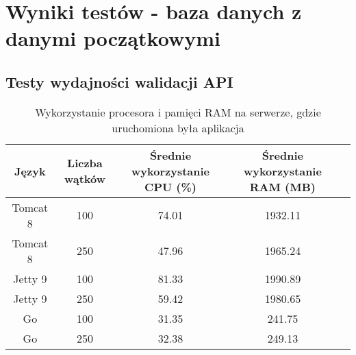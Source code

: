  \newpage
 \section{Wyniki testów - baza danych z danymi początkowymi}
 \subsection{Testy wydajności walidacji API}
% 
 \clearpage

\begin{table}[!htb]
\centering
\caption{Wykorzystanie procesora i pamięci RAM na serwerze, gdzie uruchomiona była aplikacja}
\label{tab:app-full-api}
\begin{tabular}{@{}ccccl@{}}
\toprule
\textbf{Język} & \textbf{Liczba wątków} & \multicolumn{1}{p{3cm}}{\textbf{Średnie wykorzystanie CPU (\%)}} & \multicolumn{1}{p{3cm}}{\textbf{Średnie wykorzystanie RAM (MB)}} &  \\ \midrule
Tomcat 8       & 100                    & 74.01                             & 1932.11                          &  \\
Tomcat 8       & 250                    & 47.96                             & 1965.24                          &  \\
Jetty 9       & 100                    & 81.33                             & 1990.89                          &  \\
Jetty 9       & 250                    & 59.42                             & 1980.65                          &  \\
Go       & 100                    & 31.35                             & 241.75                          &  \\
Go       & 250                    & 32.38                             & 249.13                          &  \\
\bottomrule
\end{tabular}
\end{table}



